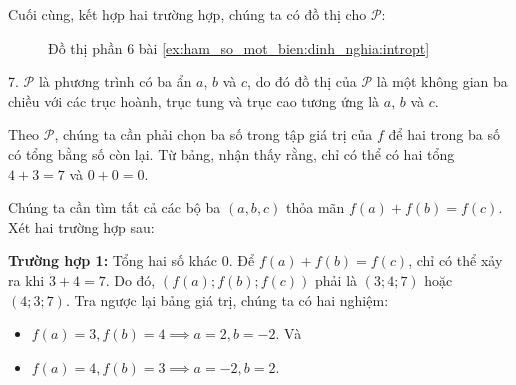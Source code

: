 Cuối cùng, kết hợp hai trường hợp, chúng ta có đồ thị cho $\mathcal{P}$:
\begin{figure}[H]
   \centering
   \caption{Đồ thị phần 6 bài \ref{ex:ham_so_mot_bien:dinh_nghia:intropt}}
   \label{fig:ham_so_mot_bien:dinh_nghia:dtp7}
\end{figure}

7. $\mathcal{P}$ là phương trình có ba ẩn $a$, $b$ và $c$, do đó đồ thị của $\mathcal{P}$ là một không gian ba chiều với các trục hoành, trục tung và trục cao tương ứng là $a$, $b$ và $c$.

Theo $\mathcal{P}$, chúng ta cần phải chọn ba số trong tập giá trị của $f$ để hai trong ba số có tổng bằng số còn lại. Từ bảng, nhận thấy rằng, chỉ có thể có hai tổng $4 + 3 = 7$ và $0 + 0 = 0$.

Chúng ta cần tìm tất cả các bộ ba $(a, b, c)$ thỏa mãn $f(a) + f(b) = f(c)$. Xét hai trường hợp sau:

\textbf{Trường hợp 1:} Tổng hai số khác 0. Để $f(a) + f(b) = f(c)$, chỉ có thể xảy ra khi $3 + 4 = 7$. Do đó, $(f(a); f(b); f(c))$ phải là $(3; 4; 7)$ hoặc $(4; 3; 7)$. Tra ngược lại bảng giá trị, chúng ta có hai nghiệm:
   \begin{itemize}
      \item $f(a)=3, f(b)=4 \implies a=2, b=-2$. Và
      \item $f(a)=4, f(b)=3 \implies a=-2, b=2$.
   \end{itemize}

